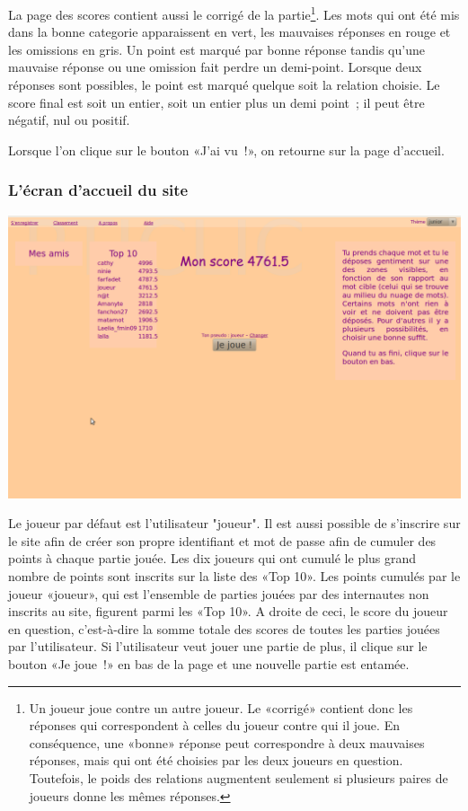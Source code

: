 \documentclass[a4paper,11pt,french]{article}
\begin{document}
La page des scores contient aussi le corrigé de la partie\footnote{Un joueur joue contre un autre joueur. Le «corrigé» contient donc les réponses qui correspondent à celles du joueur contre qui il joue. En conséquence, une «bonne» réponse peut correspondre à deux mauvaises réponses, mais qui ont été choisies par les deux joueurs en question. Toutefois, le poids des relations augmentent seulement si plusieurs paires de joueurs donne les mêmes réponses.}. Les mots qui ont été mis dans la bonne categorie apparaissent en vert, les
mauvaises réponses en rouge et les omissions en gris. Un point est marqué par bonne réponse tandis qu'une mauvaise réponse ou une omission
fait perdre un demi-point. Lorsque deux réponses sont possibles, le point est marqué quelque soit la relation choisie. Le score final est
soit un entier, soit un entier plus un demi point~; il peut être négatif, nul ou positif.

Lorsque l'on clique sur le bouton «J'ai vu~!», on retourne sur la page d'accueil.

\subsubsection{L'écran d'accueil du site}
\begin{center}
\includegraphics[width=14cm]{img/PtiClicAccueil.png}
\end{center}

Le joueur par défaut est l'utilisateur "joueur". Il est aussi possible de s'inscrire sur le site afin de créer son propre identifiant et mot
de passe afin de cumuler des points à chaque partie jouée. Les dix joueurs qui ont cumulé le plus grand nombre de points sont inscrits sur la
liste des «Top 10». Les points cumulés par le joueur «joueur», qui est l'ensemble de parties jouées par des internautes non inscrits au
site, figurent parmi les «Top 10». A droite de ceci, le score du joueur en question, c'est-à-dire la somme totale des scores de toutes les
parties jouées par l'utilisateur. Si l'utilisateur veut jouer une partie de plus, il clique sur le bouton «Je joue~!» en bas de la page et
une nouvelle partie est entamée.
\end{document}

